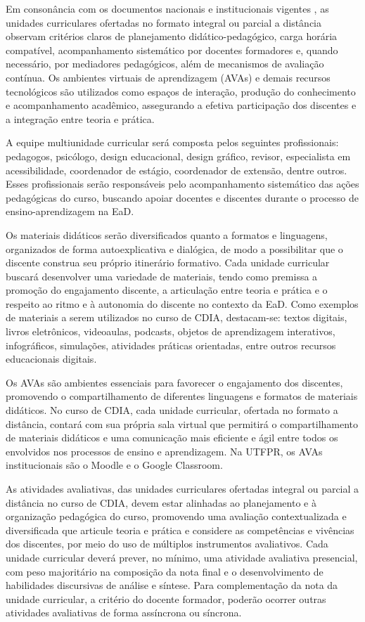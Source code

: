 Em consonância com os documentos nacionais e institucionais vigentes \cite{UTFPR_EAD_2022, Analise_DNC_2021}, as unidades curriculares ofertadas no formato integral ou parcial a distância observam critérios claros de planejamento didático-pedagógico, carga horária compatível, acompanhamento sistemático por docentes formadores e, quando necessário, por mediadores pedagógicos, além de mecanismos de avaliação contínua. Os ambientes virtuais de aprendizagem (AVAs) e demais recursos tecnológicos são utilizados como espaços de interação, produção do conhecimento e acompanhamento acadêmico, assegurando a efetiva participação dos discentes e a integração entre teoria e prática.

A equipe multiunidade curricular será composta pelos seguintes profissionais: pedagogos, psicólogo, design educacional, design gráfico, revisor, especialista em acessibilidade, coordenador de estágio, coordenador de extensão, dentre outros. Esses profissionais serão responsáveis pelo acompanhamento sistemático das ações pedagógicas do curso, buscando apoiar docentes e discentes durante o processo de ensino-aprendizagem na EaD.

Os materiais didáticos serão diversificados quanto a formatos e linguagens, organizados de forma autoexplicativa e dialógica, de modo a possibilitar que o discente construa seu próprio itinerário formativo. Cada unidade curricular buscará desenvolver uma variedade de materiais, tendo como premissa a promoção do engajamento discente, a articulação entre teoria e prática e o respeito ao ritmo e à autonomia do discente no contexto da EaD. Como exemplos de materiais a serem utilizados no curso de CDIA, destacam-se: textos digitais, livros eletrônicos, videoaulas, podcasts, objetos de aprendizagem interativos, infográficos, simulações, atividades práticas orientadas, entre outros recursos educacionais digitais.

Os AVAs são ambientes essenciais para favorecer o engajamento dos discentes, promovendo o compartilhamento de diferentes linguagens e formatos de materiais didáticos. No curso de CDIA, cada unidade curricular, ofertada no formato a distância, contará com sua própria sala virtual que permitirá o compartilhamento de materiais didáticos e uma comunicação mais eficiente e ágil entre todos os envolvidos nos processos de ensino e aprendizagem. Na UTFPR, os AVAs institucionais são o Moodle e o Google Classroom.

As atividades avaliativas, das unidades curriculares ofertadas integral ou parcial a distância no curso de CDIA, devem estar alinhadas ao planejamento e à organização pedagógica do curso, promovendo uma avaliação contextualizada e diversificada que articule teoria e prática e considere as competências e vivências dos discentes, por meio do uso de múltiplos instrumentos avaliativos. Cada unidade curricular deverá prever, no mínimo, uma atividade avaliativa presencial, com peso majoritário na composição da nota final e o desenvolvimento de habilidades discursivas de análise e síntese. Para complementação da nota da unidade curricular, a critério do docente formador, poderão ocorrer outras atividades avaliativas de forma assíncrona ou síncrona.

